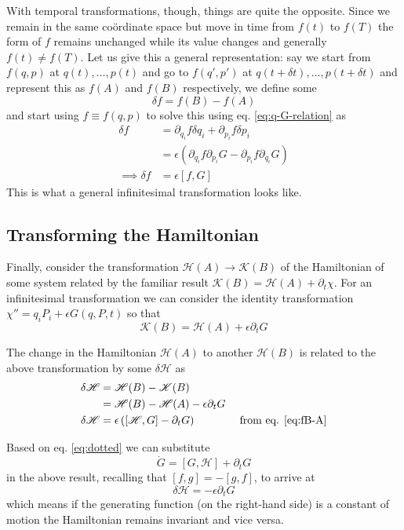 \documentclass[english,seminar,headertitle]{lecture}
\newcommand{\ham}{\mathscr{H}}
\newcommand{\kam}{\mathscr{K}}
\begin{document}
With temporal transformations, though, things are quite the opposite. Since we remain in the same co\"{o}rdinate space but move in time from $f(t)$ to $f(T)$ the form of $f$ remains unchanged while its value changes and generally $f(t) \neq f(T)$. Let us give this a general representation: say we start from $f(q,p)$ at $q(t),\ldots,p(t)$ and go to $f(q',p')$ at $q(t+\delta t),\ldots,p(t+\delta t)$ and represent this as $f(A)$ and $f(B)$ respectively, we define some
$$
\delta f = f(B) - f(A)
$$
and start using $f \equiv f(q,p)$ to solve this using eq. \eqref{eq:q-G-relation} as
\begin{align}
	\delta f &= \partial_{q_i} f \delta q_i + \partial_{p_i} f \delta p_i \nonumber\\
			&= \epsilon \left( \partial_{q_i} f \partial_{p_i} G - \partial_{p_i} f \partial_{q_i} G \right) \nonumber\\
\implies \delta f &= \epsilon [f, G] \label{eq:fB-A}
\end{align}%
This is what a general infinitesimal transformation looks like.

\subsection{Transforming the Hamiltonian}

Finally, consider the transformation $\ham(A) \rightarrow \kam(B)$ of the Hamiltonian of some system related by the familiar result $\kam(B) = \ham(A) + \partial_t \chi$. For an infinitesimal transformation we can consider the identity transformation $\chi'' = q_iP_i + \epsilon G(q,P,t)$ so that
$$
\kam(B) = \ham(A) + \epsilon \partial_t G
$$

The change in the Hamiltonian $\ham(A)$ to another $\ham(B)$ is related to the above transformation by some $\delta \ham$ as
\begin{align*}
	\delta \ham &= \ham(B) - \kam(B) \\
				&= \ham(B) - \ham(A) - \epsilon \partial_t G \\
	\delta \ham &= \epsilon \left( [\ham, G] - \partial_t G \right) \qquad\qquad\textrm{from eq. \eqref{eq:fB-A}}
\end{align*}

Based on eq. \eqref{eq:dotted} we can substitute
$$
\dot{G} = [G,\ham] + \partial_t G
$$
in the above result, recalling that $[f,g] = -[g,f]$, to arrive at
\begin{equation}
	\delta \ham = - \epsilon \partial_t G \label{eq:H-and-G}
\end{equation}%
which means if the generating function (on the right-hand side) is a constant of motion the Hamiltonian remains invariant and vice versa.
\end{document}
